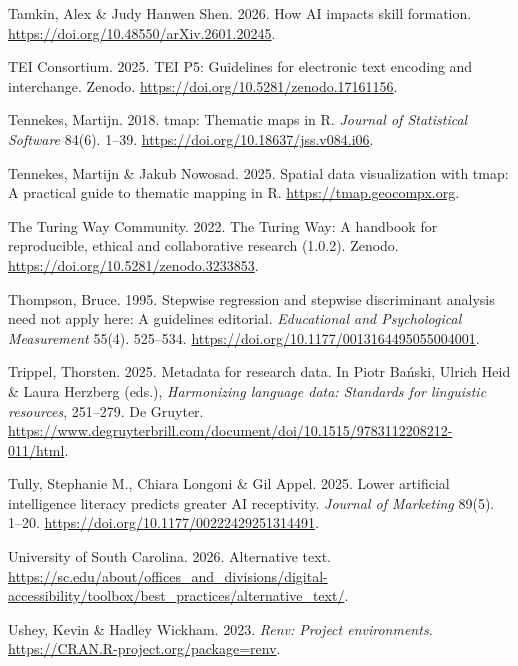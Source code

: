 \documentclass[
  letterpaper,
  DIV=11,
  numbers=noendperiod]{scrreprt}
\newlength{\cslhangindent}
\newenvironment{CSLReferences}[2] %
 {\begin{list}{}{%
  \setlength{\itemindent}{0pt}
  \setlength{\leftmargin}{0pt}
  \setlength{\parsep}{0pt}
  \ifodd #1
   \setlength{\leftmargin}{\cslhangindent}
   \setlength{\itemindent}{-1\cslhangindent}
  \fi
  \setlength{\itemsep}{#2\baselineskip}}}
 {\end{list}}
\begin{document}
\begin{CSLReferences}{1}{0}
Tamkin, Alex \& Judy Hanwen Shen. 2026. How AI impacts skill formation.
\url{https://doi.org/10.48550/arXiv.2601.20245}.

TEI Consortium. 2025. TEI P5: Guidelines for electronic text encoding
and interchange. Zenodo. \url{https://doi.org/10.5281/zenodo.17161156}.

Tennekes, Martijn. 2018. {tmap}: Thematic maps in {R}. \emph{Journal of
Statistical Software} 84(6). 1--39.
\url{https://doi.org/10.18637/jss.v084.i06}.

Tennekes, Martijn \& Jakub Nowosad. 2025. Spatial data visualization
with tmap: A practical guide to thematic mapping in {R}.
\url{https://tmap.geocompx.org}.

The Turing Way Community. 2022. The {Turing} {Way}: A handbook for
reproducible, ethical and collaborative research (1.0.2). Zenodo.
\url{https://doi.org/10.5281/zenodo.3233853}.

Thompson, Bruce. 1995. Stepwise regression and stepwise discriminant
analysis need not apply here: A guidelines editorial. \emph{Educational
and Psychological Measurement} 55(4). 525--534.
\url{https://doi.org/10.1177/0013164495055004001}.

Trippel, Thorsten. 2025. Metadata for research data. In Piotr Bański,
Ulrich Heid \& Laura Herzberg (eds.), \emph{Harmonizing language data:
Standards for linguistic resources}, 251--279. De Gruyter.
\url{https://www.degruyterbrill.com/document/doi/10.1515/9783112208212-011/html}.

Tully, Stephanie M., Chiara Longoni \& Gil Appel. 2025. Lower artificial
intelligence literacy predicts greater AI receptivity. \emph{Journal of
Marketing} 89(5). 1--20.
\url{https://doi.org/10.1177/00222429251314491}.

University of South Carolina. 2026. Alternative text.
\url{https://sc.edu/about/offices_and_divisions/digital-accessibility/toolbox/best_practices/alternative_text/}.

Ushey, Kevin \& Hadley Wickham. 2023. \emph{Renv: Project environments}.
\url{https://CRAN.R-project.org/package=renv}.


\end{CSLReferences}
\end{document}
